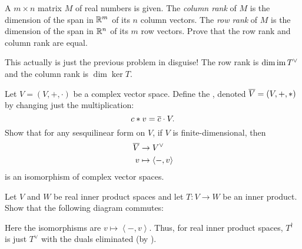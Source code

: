 \begin{dproblem}
	A $m \times n$ matrix $M$ of real numbers is given.
	The \emph{column rank} of $M$ is the dimension of the span in $\mathbb R^m$
	of its $n$ column vectors.
	The \emph{row rank} of $M$ is the dimension of the span in $\mathbb R^n$
	of its $m$ row vectors.
	Prove that the row rank and column rank are equal.
	\begin{hint}
		This actually is just the previous problem in disguise!
		The row rank is $\dim \operatorname{im} T^\vee$
		and the column rank is $\dim \ker T$.
	\end{hint}
\end{dproblem}

\begin{problem}
	\label{prob:complex_conj_space}
	Let $V = (V, +, \cdot)$ be a complex vector space.
	Define the ,
	denoted $\overline V = (V, +, \ast)$
	by changing just the multiplication:
	\[ c \ast v = \overline c \cdot V. \]
	Show that for any sesquilinear form on $V$,
	if $V$ is finite-dimensional, then
	\begin{align*}
		\overline V & \to V^\vee \\
		v &\mapsto \left< -, v \right> 
	\end{align*}
	is an isomorphism of complex vector spaces.
\end{problem}

\begin{problem}
	Let $V$ and $W$ be real inner product spaces
	and let $T \colon V \to W$ be an inner product.
	Show that the following diagram commutes:
	\begin{center}
	\end{center}
	Here the isomorphisms are $v \mapsto \left< -, v\right>$.
	Thus, for real inner product spaces,
	$T^\dagger$ is just $T^\vee$ with the duals eliminated
	(by ).
\end{problem}

